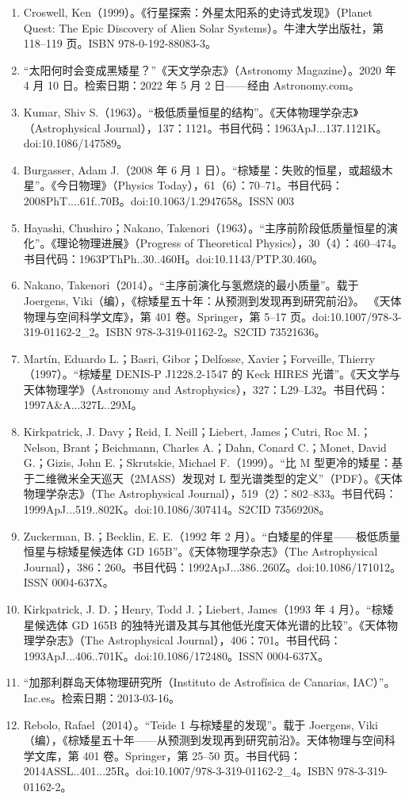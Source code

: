 \begin{enumerate}
\item Croswell, Ken（1999）。《行星探索：外星太阳系的史诗式发现》（Planet Quest: The Epic Discovery of Alien Solar Systems）。牛津大学出版社，第 118–119 页。ISBN 978-0-192-88083-3。
\item “太阳何时会变成黑矮星？”《天文学杂志》（Astronomy Magazine）。2020 年 4 月 10 日。检索日期：2022 年 5 月 2 日——经由 Astronomy.com。
\item Kumar, Shiv S.（1963）。“极低质量恒星的结构”。《天体物理学杂志》（Astrophysical Journal），137：1121。书目代码：1963ApJ...137.1121K。doi:10.1086/147589。
\item Burgasser, Adam J.（2008 年 6 月 1 日）。“棕矮星：失败的恒星，或超级木星”。《今日物理》（Physics Today），61（6）：70–71。书目代码：2008PhT....61f..70B。doi:10.1063/1.2947658。ISSN 003
\item Hayashi, Chushiro；Nakano, Takenori（1963）。“主序前阶段低质量恒星的演化”。《理论物理进展》（Progress of Theoretical Physics），30（4）：460–474。书目代码：1963PThPh..30..460H。doi:10.1143/PTP.30.460。
\item Nakano, Takenori（2014）。“主序前演化与氢燃烧的最小质量”。载于 Joergens, Viki（编），《棕矮星五十年：从预测到发现再到研究前沿》。 《天体物理与空间科学文库》，第 401 卷。Springer，第 5–17 页。doi:10.1007/978-3-319-01162-2_2。ISBN 978-3-319-01162-2。S2CID 73521636。
\item Martín, Eduardo L.；Basri, Gibor；Delfosse, Xavier；Forveille, Thierry（1997）。“棕矮星 DENIS-P J1228.2-1547 的 Keck HIRES 光谱”。《天文学与天体物理学》（Astronomy and Astrophysics），327：L29–L32。书目代码：1997A&A...327L..29M。
\item Kirkpatrick, J. Davy；Reid, I. Neill；Liebert, James；Cutri, Roc M.；Nelson, Brant；Beichmann, Charles A.；Dahn, Conard C.；Monet, David G.；Gizis, John E.；Skrutskie, Michael F.（1999）。“比 M 型更冷的矮星：基于二维微米全天巡天（2MASS）发现对 L 型光谱类型的定义”（PDF）。《天体物理学杂志》（The Astrophysical Journal），519（2）：802–833。书目代码：1999ApJ...519..802K。doi:10.1086/307414。S2CID 73569208。
\item Zuckerman, B.；Becklin, E. E.（1992 年 2 月）。“白矮星的伴星——极低质量恒星与棕矮星候选体 GD 165B”。《天体物理学杂志》（The Astrophysical Journal），386：260。书目代码：1992ApJ...386..260Z。doi:10.1086/171012。ISSN 0004-637X。
\item Kirkpatrick, J. D.；Henry, Todd J.；Liebert, James（1993 年 4 月）。“棕矮星候选体 GD 165B 的独特光谱及其与其他低光度天体光谱的比较”。《天体物理学杂志》（The Astrophysical Journal），406：701。书目代码：1993ApJ...406..701K。doi:10.1086/172480。ISSN 0004-637X。
\item “加那利群岛天体物理研究所（Instituto de Astrofísica de Canarias, IAC）”。Iac.es。检索日期：2013-03-16。
\item Rebolo, Rafael（2014）。“Teide 1 与棕矮星的发现”。载于 Joergens, Viki（编），《棕矮星五十年——从预测到发现再到研究前沿》。天体物理与空间科学文库，第 401 卷。Springer，第 25–50 页。书目代码：2014ASSL..401...25R。doi:10.1007/978-3-319-01162-2_4。ISBN 978-3-319-01162-2。


\end{enumerate}
